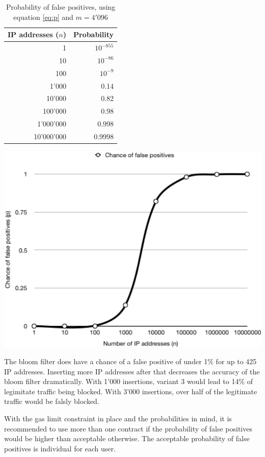 \begin{table}[ht]
\begin{minipage}[b]{.45\textwidth}
        \begin{tabular}{r | r}
            \hline
            IP addresses ($n$) & Probability \\ \hline
            1 & $10^{-855}$ \\ \hline
            10 & $10^{-86}$ \\ \hline
            100 & $10^{-9}$ \\ \hline
            1'000 & 0.14 \\ \hline
            10'000 & 0.82 \\ \hline
            100'000 & 0.98 \\ \hline
            1'000'000 & 0.998 \\ \hline
            10'000'000 & 0.9998 \\ \hline
        \end{tabular}
            \caption{Probability of false positives, using equation \ref{eq:p} and $m = 4'096$}
            \label{table:Probability}
\end{minipage}
\hspace{.1\textwidth}
\begin{minipage}[b]{.45\textwidth}
        \includegraphics[width=1\textwidth]{v3-chance.png}
        \label{fig:Probability}
\end{minipage}
\end{table}

The bloom filter does have a chance of a false positive of under 1\% for up to 425 IP addresses. Inserting more IP addresses after that decreases the accuracy of the bloom filter dramatically. With 1'000 insertions, variant 3 would lead to 14\% of legimitate traffic being blocked. With 3'000 insertions, over half of the legitimate traffic would be falsly blocked.

With the gas limit constraint in place and the probabilities in mind, it is recommended to use more than one contract if the probability of false positives would be higher than acceptable otherwise. The acceptable probability of false positives is individual for each user.

